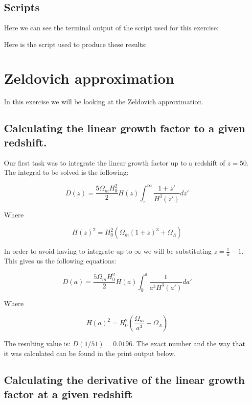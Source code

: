 \documentclass[a4paper,10pt]{article}
\begin{document}
\subsection{Scripts}

Here we can see the terminal output of the script used for this exercise:


Here is the script used to produce these results: 


\section{Zeldovich approximation} 

In this exercise we will be looking at the Zeldovich approximation. 

\subsection{Calculating the linear growth factor to a given redshift.}

Our first task was to integrate the linear growth factor up to a redshift of $z=50$. The integral to be solved is the following:

\begin{equation}
D(z) = \frac{5\Omega_mH_0^2}{2}H(z)\int_z^\infty\frac{1+z'}{H^3(z')}dz'
\end{equation}

Where 

\begin{equation}
H(z)^2 = H^2_0(\Omega_m(1+z)^3+\Omega_\Lambda)
\end{equation}

In order to avoid having to integrate up to $\infty$ we will be substituting $z = \frac{1}{a} -1$. This gives us the following equations:

\begin{equation}
D(a) = \frac{5\Omega_mH_0^2}{2}H(a)\int_0^a\frac{1}{a^3H^3(a')}da'
\end{equation}

Where 

\begin{equation}
H(a)^2 = H^2_0(\frac{\Omega_m}{a^3}+\Omega_\Lambda)
\end{equation}

The resulting value is: $D(1/51) = 0.0196$. The exact number and the way that it was calculated can be found in the print output below. 

\subsection{Calculating the derivative of the linear growth factor at a given redshift}
\end{document}
